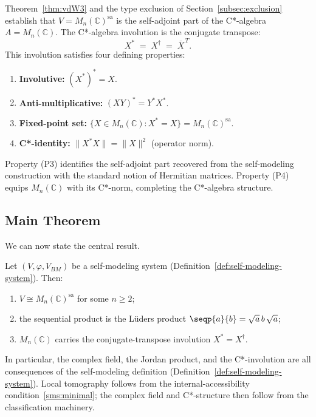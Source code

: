 Theorem~\ref{thm:vdW3} and the type exclusion of
Section~\ref{subsec:exclusion} establish that
$V = M_n(\mathbb{C})^{\mathrm{sa}}$ is the self-adjoint part of the
C*-algebra $A = M_n(\mathbb{C})$. The C*-algebra involution is the
conjugate transpose:
\[
  X^* \;=\; X^\dagger \;=\; \overline{X}^{\,T}.
\]
This involution satisfies four defining properties:
\begin{enumerate}
\item[\emph{(P1)}] \textbf{Involutive:} $(X^*)^* = X$.
\item[\emph{(P2)}] \textbf{Anti-multiplicative:} $(XY)^* = Y^*X^*$.
\item[\emph{(P3)}] \textbf{Fixed-point set:}
  $\{X \in M_n(\mathbb{C}) : X^* = X\}
  = M_n(\mathbb{C})^{\mathrm{sa}}$.
\item[\emph{(P4)}] \textbf{C*-identity:}
  $\|X^*X\| = \|X\|^2$ (operator norm).
\end{enumerate}
Property (P3) identifies the self-adjoint part recovered from the
self-modeling construction with the standard notion of Hermitian matrices.
Property (P4) equips $M_n(\mathbb{C})$ with its C*-norm, completing the
C*-algebra structure.

\subsection{Main Theorem}\label{subsec:main-theorem}

We can now state the central result.

\begin{theorem}\label{thm:main}
Let $(V, \varphi, V_{BM})$ be a self-modeling system
(Definition~\ref{def:self-modeling-system}).  Then:
\begin{enumerate}
\item $V \cong M_n(\mathbb{C})^{\mathrm{sa}}$ for some $n \ge 2$;
\item the sequential product is the L\"uders product
  $\seqp{a}{b} = \sqrt{a}\, b\, \sqrt{a}$;
\item $M_n(\mathbb{C})$ carries the conjugate-transpose involution
  $X^* = X^\dagger$.
\end{enumerate}
\end{theorem}

In particular, the complex field, the Jordan product, and the
C*-involution are all consequences of the self-modeling definition
(Definition~\ref{def:self-modeling-system}).  Local tomography follows
from the internal-accessibility condition~\ref{sms:minimal}; the
complex field and C*-structure then follow from the classification
machinery.

